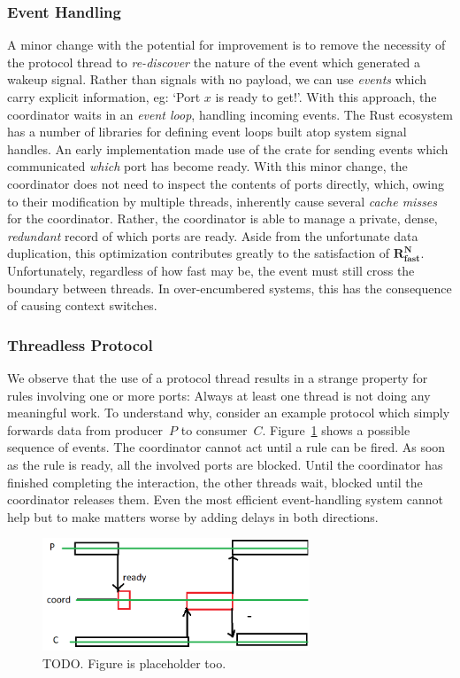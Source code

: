\subsubsection{Event Handling}
A minor change with the potential for improvement is to remove the necessity of the protocol thread to \textit{re-discover} the nature of the event which generated a wakeup signal. Rather than signals with no payload, we can use \textit{events} which carry explicit information, eg: `Port $x$ is ready to get!'. With this approach, the coordinator waits in an \textit{event loop}, handling incoming events. The Rust ecosystem has a number of libraries for defining event loops built atop system signal handles. An early implementation made use of the  crate for sending events which communicated \textit{which} port has become ready. With this minor change, the coordinator does not need to inspect the contents of ports directly, which, owing to their modification by multiple threads, inherently cause several \textit{cache misses} for the coordinator. Rather, the coordinator is able to manage a private, dense, \textit{redundant} record of which ports are ready. Aside from the unfortunate data duplication, this optimization contributes greatly to the satisfaction of $\boldsymbol{R^N_{fast}}$. Unfortunately, regardless of how fast  may be, the event must still cross the boundary between threads. In over-encumbered systems, this has the consequence of causing context switches.

\subsubsection{Threadless Protocol}
We observe that the use of a protocol thread results in a strange property for rules involving one or more ports: Always at least one thread is not doing any meaningful work. To understand why, consider an example protocol which simply forwards data from producer~$P$ to consumer~$C$. Figure~\ref{fig:sequence_diag} shows a possible sequence of events. The coordinator cannot act until a rule can be fired. As soon as the rule is ready, all the involved ports are blocked. Until the coordinator has finished completing the interaction, the other threads wait, blocked until the coordinator releases them. Even the most efficient event-handling system cannot help but to make matters worse by adding delays in both directions.

\begin{figure}[t]
	\centering
	\includegraphics[width=8cm]{sequence.png}
	\caption[Thread activity with an event-handling coordinator.]{TODO. Figure is placeholder too.}
	\label{fig:sequence_diag}
\end{figure}

